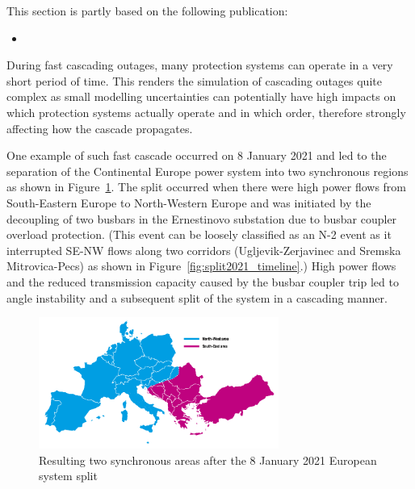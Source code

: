 \begin{tcolorbox}[width=\linewidth, sharp corners=all,
    colback=white!80!black,
    colframe=white!80!black]
This section is partly based on the following publication:
\begin{itemize}
    \item {}
\end{itemize}
\end{tcolorbox}

During fast cascading outages, many protection systems can operate in a very short period of time. This renders the simulation of cascading outages quite complex as small modelling uncertainties can potentially have high impacts on which protection systems actually operate and in which order, therefore strongly affecting how the cascade propagates.

One example of such fast cascade occurred on 8 January 2021 and led to the separation of the Continental Europe power system into two synchronous regions as shown in Figure~\ref{fig:split2021}. The split occurred when there were high power flows from South-Eastern Europe to North-Western Europe and was initiated by the decoupling of two busbars in the Ernestinovo substation due to busbar coupler overload protection. (This event can be loosely classified as an N-2 event as it interrupted SE-NW flows along two corridors (Ugljevik-Zerjavinec and Sremska Mitrovica-Pecs) as shown in Figure~\ref{fig:split2021_timeline}.) High power flows and the reduced transmission capacity caused by the busbar coupler trip led to angle instability and a subsequent split of the system in a cascading manner.

\begin{figure}
    \centering
    \includegraphics[width = 0.7\textwidth]{Figs/SystemSplit2021.pdf}
    \caption{Resulting two synchronous areas after the 8 January 2021 European system split~\cite{ENTSOESplitJan2021}}
    \label{fig:split2021}
\end{figure}


